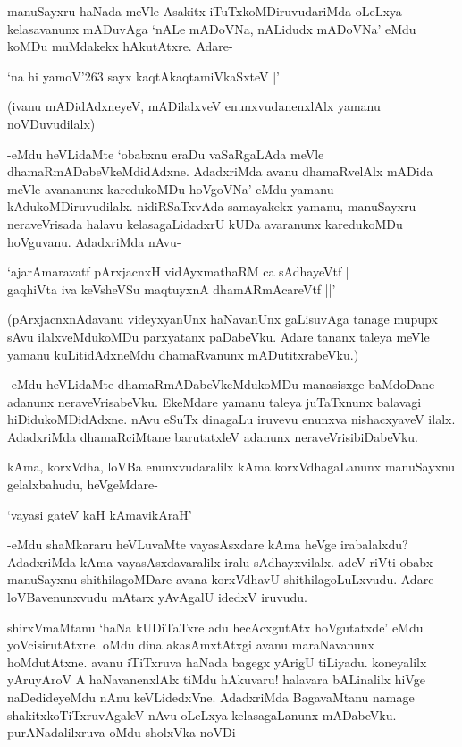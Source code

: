 manuSayxru haNada meVle Asakitx iTuTxkoMDiruvudariMda oLeLxya kelasavanunx mADuvAga `nALe mADoVNa, nALidudx mADoVNa' eMdu koMDu muMdakekx hAkutAtxre. Adare-

\begin{shloka}
`na hi yamoV\char'263 sayx kaqtAkaqtamiVkaSxteV‌ |'
\end{shloka}

(ivanu mADidAdxneyeV, mADilalxveV enunxvudanenxlAlx yamanu noVDuvudilalx)

-eMdu heVLidaMte `obabxnu eraDu vaSaRgaLAda meVle dhamaRmADabeVkeMdidAdxne. AdadxriMda avanu dhamaRvelAlx mADida meVle avananunx karedukoMDu hoVgoVNa' eMdu yamanu kAdukoMDiruvudilalx. nidiRSaTxvAda samayakekx yamanu, manuSayxru neraveVrisada halavu kelasagaLidadxrU kUDa avaranunx karedukoMDu hoVguvanu. AdadxriMda nAvu-

\begin{shloka}
`ajarAmaravatf pArxjacnxH vidAyxmathaRM ca sAdhayeVtf |\\
gaqhiVta iva keVsheVSu maqtuyxnA dhamARmAcareVtf ||'
\end{shloka}

(pArxjacnxnAdavanu videyxyanUnx haNavanUnx gaLisuvAga tanage mupupx sAvu ilalxveMdukoMDu parxyatanx paDabeVku. Adare tananx taleya meVle yamanu kuLitidAdxneMdu dhamaRvanunx mADutitxrabeVku.)

-eMdu heVLidaMte dhamaRmADabeVkeMdukoMDu manasisxge baMdoDane adanunx neraveVrisabeVku. EkeMdare yamanu taleya juTaTxnunx balavagi hiDidukoMDidAdxne. nAvu eSuTx dinagaLu iruvevu enunxva nishacxyaveV ilalx. AdadxriMda dhamaRciMtane barutatxleV adanunx neraveVrisibiDabeVku.

kAma, korxVdha, loVBa enunxvudaralilx kAma korxVdhagaLanunx manuSayxnu gelalxbahudu, heVgeMdare-

\begin{shloka}
`vayasi gateV kaH kAmavikAraH'
\end{shloka}

-eMdu shaMkararu heVLuvaMte vayasAsxdare kAma heVge irabalalxdu? AdadxriMda kAma vayasAsxdavaralilx iralu sAdhayxvilalx. adeV riVti obabx manuSayxnu shithilagoMDare avana korxVdhavU shithilagoLuLxvudu. Adare loVBavenunxvudu mAtarx yAvAgalU idedxV iruvudu.

shirxVmaMtanu `haNa kUDiTaTxre adu hecAcxgutAtx hoVgutatxde' eMdu yoVcisirutAtxne. oMdu dina akasAmxtAtxgi avanu maraNavanunx hoMdutAtxne. avanu iTiTxruva haNada bagegx yArigU tiLiyadu. koneyalilx yAruyAroV A haNavanenxlAlx tiMdu hAkuvaru! halavara bALinalilx hiVge naDedideyeMdu nAnu keVLidedxVne. AdadxriMda BagavaMtanu namage shakitxkoTiTxruvAgaleV nAvu oLeLxya kelasagaLanunx mADabeVku. purANadalilxruva oMdu sholxVka noVDi-


